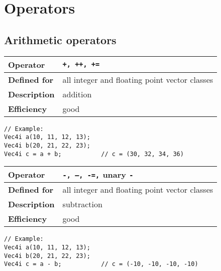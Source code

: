 \documentclass[vcl_manual.tex]{subfiles}
\begin{document}
\chapter{Operators}\label{chap:Operators}

\section{Arithmetic operators}

\flushleft

\begin{tabular}{|p{25mm}|p{100mm}|}
\hline
\bfseries Operator & \texttt{+, ++, +=} \\ \hline
\bfseries Defined for & all integer and floating point vector classes \\ \hline
\bfseries Description & addition \\ \hline
\bfseries Efficiency & good \\ \hline
\end{tabular}
\begin{lstlisting}[frame=none]
// Example:
Vec4i a(10, 11, 12, 13);
Vec4i b(20, 21, 22, 23);
Vec4i c = a + b;           // c = (30, 32, 34, 36)
\end{lstlisting}


\begin{tabular}{|p{25mm}|p{100mm}|}
\hline
\bfseries Operator & \texttt{-, --, -=,} unary \texttt{-} \\ \hline
\bfseries Defined for & all integer and floating point vector classes \\ \hline
\bfseries Description & subtraction \\ \hline
\bfseries Efficiency & good \\ \hline
\end{tabular}
\begin{lstlisting}[frame=none]
// Example:
Vec4i a(10, 11, 12, 13);
Vec4i b(20, 21, 22, 23);
Vec4i c = a - b;           // c = (-10, -10, -10, -10)
\end{lstlisting}
\end{document}
